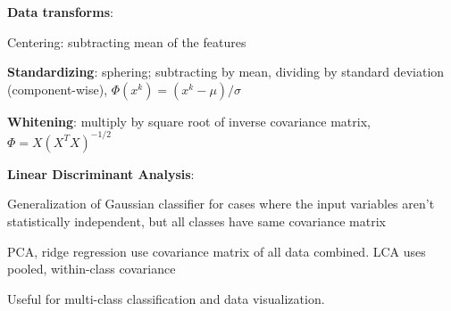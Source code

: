 \documentclass[10pt,landscape]{article}
\begin{document}
\begin{multicols}{3}
\textbf{Data transforms}:

Centering: subtracting mean of the features

\textbf{Standardizing}: sphering; subtracting by mean, dividing by standard deviation (component-wise), $\Phi(x^k) = (x^k - \mu) / \sigma$

\textbf{Whitening}: multiply by square root of inverse covariance matrix, $\Phi = X(X^T X)^{-1/2}$

\textbf{Linear Discriminant Analysis}:

Generalization of Gaussian classifier for cases where the input variables aren't statistically independent, but all classes have same covariance matrix

PCA, ridge regression use covariance matrix of all data combined. LCA uses pooled, within-class covariance

Useful for multi-class classification and data visualization. 


\end{multicols}
\end{document}
